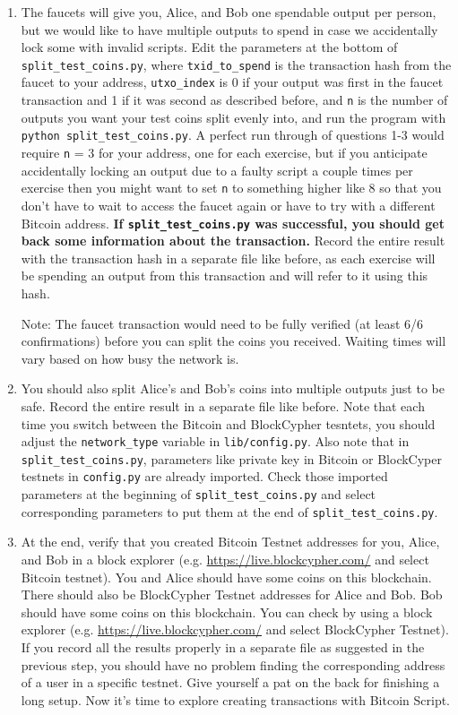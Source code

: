 \documentclass[11pt]{article}
\begin{document}
\begin{enumerate}
    \item The faucets will give you, Alice, and Bob one spendable output per person, but we would like to have multiple outputs to spend in case we accidentally lock some with invalid scripts. Edit the parameters at the bottom of \texttt{split\_test\_coins.py}, where \texttt{txid\_to\_spend} is the transaction hash from the faucet to your address, \texttt{utxo\_index} is 0 if your output was first in the faucet transaction and 1 if it was second as described before, and \texttt{n} is the number of outputs you want your test coins split evenly into, and run the program with \texttt{python split\_test\_coins.py}. A perfect run through of questions 1-3 would require \texttt{n} = 3 for your address, one for each exercise, but if you anticipate accidentally locking an output due to a faulty script a couple times per exercise then you might want to set \texttt{n} to something higher like 8 so that you don't have to wait to access the faucet again or have to try with a different Bitcoin address. \textbf{If \texttt{split\_test\_coins.py} was successful, you should get back some information about the transaction.} Record the entire result with the transaction hash in a separate file like before, as each exercise will be spending an output from this transaction and will refer to it using this hash.
    
    Note: The faucet transaction would need to be fully verified (at least 6/6 confirmations) before you can split the coins you received. Waiting times will vary based on how busy the network is.
    
    \item You should also split Alice's and Bob's coins into multiple outputs just to be safe. Record the entire result in a separate file like before. Note that each time you switch between the Bitcoin and BlockCypher tesntets, you should adjust the \texttt{network\_type} variable in \texttt{lib/config.py}. Also note that in \texttt{split\_test\_coins.py}, parameters like private key in Bitcoin or BlockCyper testnets  in \texttt{config.py} are already imported. Check those imported parameters at the beginning of \texttt{split\_test\_coins.py} and select corresponding parameters to put them at the end of \texttt{split\_test\_coins.py}.

    \item At the end, verify that you created Bitcoin Testnet addresses for you,  Alice, and Bob in a block explorer (e.g. \href{https://live.blockcypher.com/}{https://live.blockcypher.com/} and select Bitcoin testnet). You and Alice should have some coins on this blockchain. There should also be BlockCypher Testnet addresses for Alice and Bob. Bob should have some coins on this blockchain. You can check by using a block explorer (e.g. \href{https://live.blockcypher.com/}{https://live.blockcypher.com/}  and select BlockCypher Testnet). If you record all the results properly in a separate file as suggested in the previous step, you should have no problem finding the corresponding address of a user in a specific testnet. Give yourself a pat on the back for finishing a long setup. Now it's time to explore creating transactions with Bitcoin Script.
\end{enumerate}
\end{document}
